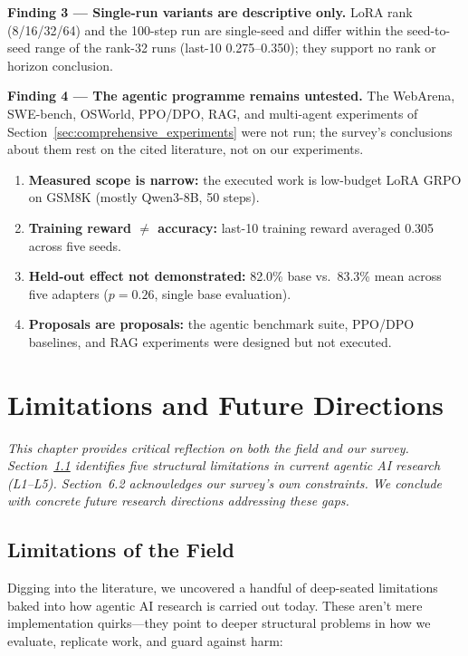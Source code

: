 \documentclass[12pt,a4paper]{report}
\theoremstyle{definition}
\begin{document}
\textbf{Finding 3 --- Single-run variants are descriptive only.}
LoRA rank (8/16/32/64) and the 100-step run are single-seed and differ within the seed-to-seed range of the rank-32 runs (last-10 0.275--0.350); they support no rank or horizon conclusion.

\textbf{Finding 4 --- The agentic programme remains untested.}
The WebArena, SWE-bench, OSWorld, PPO/DPO, RAG, and multi-agent experiments of Section~\ref{sec:comprehensive_experiments} were not run; the survey's conclusions about them rest on the cited literature, not on our experiments.

\begin{tcolorbox}[colback=purple!5!white, colframe=purple!60!black, title=\textbf{Chapter 5 Key Takeaways (Empirical)}]
\begin{enumerate}
    \item \textbf{Measured scope is narrow:} the executed work is low-budget LoRA GRPO on GSM8K (mostly Qwen3-8B, 50 steps).
    \item \textbf{Training reward $\neq$ accuracy:} last-10 training reward averaged 0.305 across five seeds.
    \item \textbf{Held-out effect not demonstrated:} 82.0\% base vs.\ 83.3\% mean across five adapters ($p=0.26$, single base evaluation).
    \item \textbf{Proposals are proposals:} the agentic benchmark suite, PPO/DPO baselines, and RAG experiments were designed but not executed.
\end{enumerate}
\end{tcolorbox}

\chapter{Limitations and Future Directions}
\label{ch:limitations}

\textit{This chapter provides critical reflection on both the field and our survey. Section~\ref{sec:field-limitations} identifies five structural limitations in current agentic AI research (L1--L5). Section~6.2 acknowledges our survey's own constraints. We conclude with concrete future research directions addressing these gaps.}

\vspace{0.3cm}
\section{Limitations of the Field}
\label{sec:field-limitations}
Digging into the literature, we uncovered a handful of deep-seated limitations baked into how agentic AI research is carried out today. These aren't mere implementation quirks---they point to deeper structural problems in how we evaluate, replicate work, and guard against harm:
\end{document}
